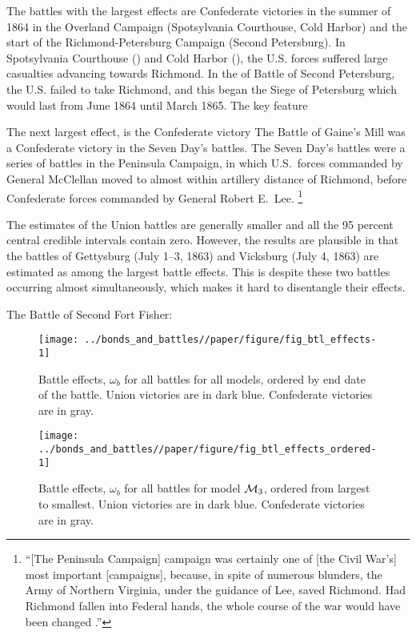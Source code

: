 The battles with the largest effects are Confederate victories in the summer of 1864 in the Overland Campaign (Spotsylvania Courthouse, Cold Harbor) and the start of the Richmond-Petersburg Campaign (Second Petersburg).
In Spotsylvania Courthouse () and Cold Harbor (), the U.S. forces suffered large casualties advancing towards Richmond.
In the of Battle of Second Petersburg, the U.S. failed to take Richmond, and this began the Siege of Petersburg which would last from June 1864 until March 1865.
The key feature 

The next largest effect, is the Confederate victory The Battle of Gaine's Mill was a Confederate victory in the Seven Day's battles. 
The Seven Day's battles were a series of battles in the Peninsula Campaign, in which U.S.\ forces commanded by General McClellan moved to almost within artillery distance of Richmond, before Confederate forces commanded by General Robert E.\ Lee.
\footnote{
  ``[The Peninsula Campaign] campaign was certainly one of [the Civil War's] most important [campaigns], because, in spite of numerous blunders, the Army of Northern Virginia, under the guidance of Lee, saved Richmond. Had Richmond fallen into Federal hands, the whole course of the war would have been changed \parencite[206]{Fuller1942a}.''
}

The estimates of the Union battles are generally smaller and all the 95 percent central credible intervals contain zero.
However, the results are plausible in that the battles of Gettysburg (July 1--3, 1863) and Vicksburg (July 4, 1863) are estimated as among the largest battle effects.
This is despite these two battles occurring almost simultaneously, which makes it hard to disentangle their effects.

The Battle of Second Fort Fisher:

\begin{figure}[!htpb]
  \centering
  \texttt{[image: ../bonds\_and\_battles//paper/figure/fig\_btl\_effects-1]}
  \caption[Battle Effects on log-yields for all models]{Battle effects, $\omega_{b}$ for all battles for all models, ordered by end date of the battle.
    Union victories are in dark blue. Confederate victories are in gray.
  }
  \label{bonds:fig:btl_effects}
\end{figure}

\begin{figure}[!htpb]
  \centering
  \texttt{[image: ../bonds\_and\_battles//paper/figure/fig\_btl\_effects\_ordered-1]}  
  \caption[Battle effects for model $\Model{3}$, ordered by magnitude]{
    Battle effects, $\omega_{b}$ for all battles for model $\Model{3}$, ordered from largest to smallest.
    Union victories are in dark blue. Confederate victories are in gray.
  }
  \label{bonds:fig:btl_effects_ordered}
\end{figure}

